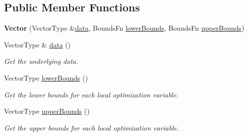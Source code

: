 \subsection*{Public Member Functions}
\begin{DoxyCompactItemize}
\item 
\hypertarget{classop_1_1Vector_aad3bc58b60937fb36f17343394701dd3}{{\bfseries Vector} (Vector\-Type \&\hyperlink{classop_1_1Vector_aa64decab605d7e408b8606fef7ddc8ea}{data}, Bounds\-Fn \hyperlink{classop_1_1Vector_a2a3ee86c58aaa32ccbd47aa0590cd108}{lower\-Bounds}, Bounds\-Fn \hyperlink{classop_1_1Vector_a5c5de10b7b946279045a92381638fcdd}{upper\-Bounds})}\label{classop_1_1Vector_aad3bc58b60937fb36f17343394701dd3}

\item 
\hypertarget{classop_1_1Vector_aa64decab605d7e408b8606fef7ddc8ea}{Vector\-Type \& \hyperlink{classop_1_1Vector_aa64decab605d7e408b8606fef7ddc8ea}{data} ()}\label{classop_1_1Vector_aa64decab605d7e408b8606fef7ddc8ea}

\begin{DoxyCompactList}\small\item\em Get the underlying data. \end{DoxyCompactList}\item 
\hypertarget{classop_1_1Vector_a2a3ee86c58aaa32ccbd47aa0590cd108}{Vector\-Type \hyperlink{classop_1_1Vector_a2a3ee86c58aaa32ccbd47aa0590cd108}{lower\-Bounds} ()}\label{classop_1_1Vector_a2a3ee86c58aaa32ccbd47aa0590cd108}

\begin{DoxyCompactList}\small\item\em Get the lower bounds for each local optimization variable. \end{DoxyCompactList}\item 
\hypertarget{classop_1_1Vector_a5c5de10b7b946279045a92381638fcdd}{Vector\-Type \hyperlink{classop_1_1Vector_a5c5de10b7b946279045a92381638fcdd}{upper\-Bounds} ()}\label{classop_1_1Vector_a5c5de10b7b946279045a92381638fcdd}

\begin{DoxyCompactList}\small\item\em Get the upper bounds for each local optimization variable. \end{DoxyCompactList}\end{DoxyCompactItemize}
